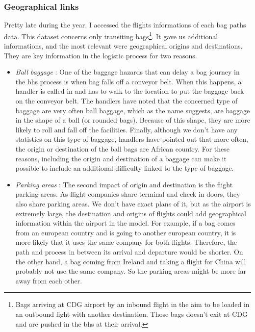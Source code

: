 \documentclass[12pt]{article}
\begin{document}
\newpage
\subsubsection{Geographical links}

Pretty late during the year, I accessed the flights informations of each bag paths data. This dataset concerns only transiting bags\footnote{Bags arriving at CDG airport by an inbound flight in the aim to be loaded in an outbound fight with another destination. Those bags doesn't exit at CDG and are pushed in the \acrshort{bhs} at their arrival.}. It gave us additional informations, and the most relevant were geographical origins and destinations. They are key information in the logistic process for two reasons. 
\begin{itemize}
    \item \textit{Ball baggage} : One of the baggage hazards that can delay a bag journey in the \acrshort{bhs} process is when bag falls off a conveyor belt. When this happens, a handler is called in and has to walk to the location to put the baggage back on the conveyor belt. The handlers have noted that the concerned type of baggage are very often ball baggage, which as the name suggests, are baggage in the shape of a ball (or rounded bags). Because of this shape, they are more likely to roll and fall off the facilities. Finally, although we don't have any statistics on this type of baggage, handlers have pointed out that more often, the origin or destination of the ball bags are African country. For these reasons, including the origin and destination of a baggage can make it possible to include an additional difficulty linked to the type of baggage.


    \item \textit{Parking areas} : The second impact of origin and destination is the flight parking areas. As flight companies share terminal and check in doors, they also share parking areas. We don't have exact plans of it, but as the airport is extremely large, the destination and origins of flights could add geographical information within the airport in the model. For example, if a bag comes from an european country and is going to another european country, it is more likely that it uses the same company for both flights. Therefore, the path and process in between its arrival and departure would be shorter. On the other hand, a bag coming from Ireland and taking a flight for China will probably not use the same company. So the parking areas might be more far away from each other.
\end{itemize}
\end{document}
